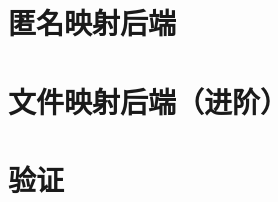 
\section{匿名映射后端}
\label{sec:mmap-anon}


\section{文件映射后端（进阶）}
\label{sec:mmap-file}


\section{验证}
\label{sec:mmap-verify}


